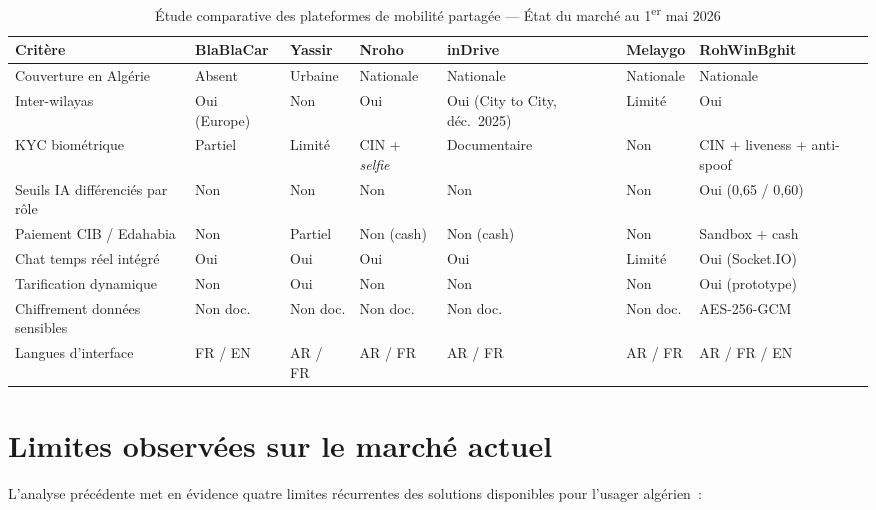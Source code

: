 \begin{table}[H]
\centering
\small
\begin{tabularx}{\textwidth}{|l|X|X|X|X|X|X|}
\hline
\rowcolor{rohlight}
\textbf{Critère} & \textbf{BlaBlaCar} & \textbf{Yassir} & \textbf{Nroho} & \textbf{inDrive} & \textbf{Melaygo} & \textbf{RohWinBghit} \\
\hline
Couverture en Algérie & Absent & Urbaine & Nationale & Nationale & Nationale & Nationale \\
\hline
Inter-wilayas & Oui (Europe) & Non & Oui & Oui (City to City, déc.~2025) & Limité & Oui \\
\hline
KYC biométrique & Partiel & Limité & CIN + \textit{selfie} & Documentaire & Non & CIN + liveness + anti-spoof \\
\hline
Seuils IA différenciés par rôle & Non & Non & Non & Non & Non & Oui (0,65 / 0,60) \\
\hline
Paiement CIB / Edahabia & Non & Partiel & Non (cash) & Non (cash) & Non & Sandbox + cash \\
\hline
Chat temps réel intégré & Oui & Oui & Oui & Oui & Limité & Oui (Socket.IO) \\
\hline
Tarification dynamique & Non & Oui & Non & Non & Non & Oui (prototype) \\
\hline
Chiffrement données sensibles & Non doc. & Non doc. & Non doc. & Non doc. & Non doc. & AES-256-GCM \\
\hline
Langues d'interface & FR / EN & AR / FR & AR / FR & AR / FR & AR / FR & AR / FR / EN \\
\hline
\end{tabularx}
  \caption{Étude comparative des plateformes de mobilité partagée --- État du marché au 1\textsuperscript{er} mai 2026}
  \label{tab:comparatif}
\end{table}

\section{Limites observées sur le marché actuel}
\label{sec:limites}

L'analyse précédente met en évidence quatre limites récurrentes des solutions disponibles pour l'usager algérien~:

